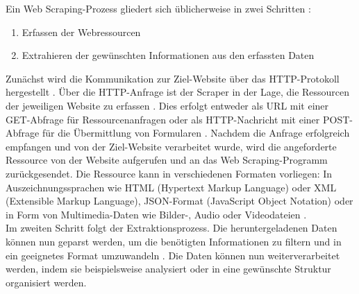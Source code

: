 \documentclass[german,bachelor]{swsLeipzig}
\begin{document}
Ein Web Scraping-Prozess gliedert sich üblicherweise in zwei Schritten \cite[]{zhao2017web}:
\begin{enumerate}
 \item Erfassen der Webressourcen
 \item Extrahieren der gewünschten Informationen aus den erfassten Daten
\end{enumerate}
Zunächst wird die Kommunikation zur Ziel-Website über das HTTP-Protokoll hergestellt \cite[]{10.1093/bib/bbt026}.
Über die HTTP-Anfrage ist der Scraper in der Lage, die Ressourcen der jeweiligen Website zu erfassen \cite[]{zhao2017web}.
Dies erfolgt entweder als URL mit einer GET-Abfrage für Ressourcenanfragen oder als HTTP-Nachricht mit einer
POST-Abfrage für die Übermittlung von Formularen \cite[]{10.1093/bib/bbt026}.
Nachdem die Anfrage erfolgreich empfangen und von der Ziel-Website verarbeitet wurde, wird die angeforderte Ressource
von der Website aufgerufen und an das Web Scraping-Programm zurückgesendet.
Die Ressource kann in verschiedenen Formaten vorliegen:
In Auszeichnungssprachen wie HTML (Hypertext Markup Language) oder XML (Extensible Markup Language), JSON-Format
(JavaScript Object Notation) oder in Form von Multimedia-Daten wie Bilder-, Audio oder Videodateien \cite[]{zhao2017web}.\\
\indent Im zweiten Schritt folgt der Extraktionsprozess.
Die heruntergeladenen Daten können nun geparst werden, um die benötigten Informationen zu filtern und in ein geeignetes Format
umzuwandeln \cite[]{10.1093/bib/bbt026}.
Die Daten können nun weiterverarbeitet werden, indem sie beispielsweise analysiert oder in eine gewünschte Struktur
organisiert werden.\\
\end{document}
